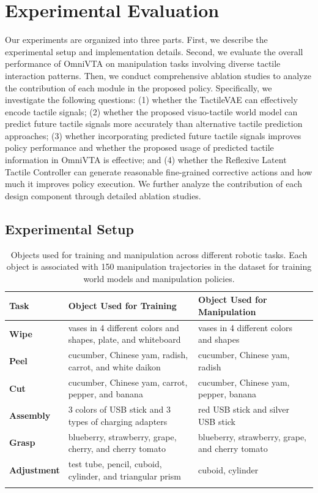 \section{Experimental Evaluation}
Our experiments are organized into three parts. First, we describe the experimental setup and implementation details. Second, we evaluate the overall performance of OmniVTA on manipulation tasks involving diverse tactile interaction patterns. Then, we conduct comprehensive ablation studies to analyze the contribution of each module in the proposed policy.
Specifically, we investigate the following questions: 
(1) whether the TactileVAE can effectively encode tactile signals; 
(2) whether the proposed visuo-tactile world model can predict future tactile signals more accurately than alternative tactile prediction approaches; 
(3) whether incorporating predicted future tactile signals improves policy performance and whether the proposed usage of predicted tactile information in OmniVTA is effective; and 
(4) whether the Reflexive Latent Tactile Controller can generate reasonable fine-grained corrective actions and how much it improves policy execution. 
We further analyze the contribution of each design component through detailed ablation studies.

\subsection{Experimental Setup}

\begin{table}[t]
\centering
\caption{Objects used for training and manipulation across different robotic tasks. Each object is associated with 150 manipulation trajectories in the dataset for training world models and manipulation policies.}
\small
\renewcommand{\arraystretch}{1.2}
\begin{tabular}{@{} l l l @{}}
\toprule
\textbf{Task} & \textbf{Object Used for Training} & \textbf{Object Used for Manipulation} \\
\midrule
\textbf{Wipe} & vases in 4 different colors and shapes, plate, and whiteboard  & vases in 4 different colors and shapes \\
\textbf{Peel} & cucumber, Chinese yam, radish, carrot, and white daikon & cucumber, Chinese yam, radish \\
\textbf{Cut} & cucumber, Chinese yam, carrot, pepper, and banana & cucumber, Chinese yam, pepper, banana \\
\textbf{Assembly} & 3 colors of USB stick and 3 types of charging adapters & red USB stick and silver USB stick \\
\textbf{Grasp} & blueberry, strawberry, grape, cherry, and cherry tomato & blueberry, strawberry, grape, and cherry tomato \\
\textbf{Adjustment} & test tube, pencil, cuboid, cylinder, and triangular prism & cuboid, cylinder \\
\bottomrule
\label{tab:object}
\end{tabular}
\vspace{-5mm}
\end{table}

